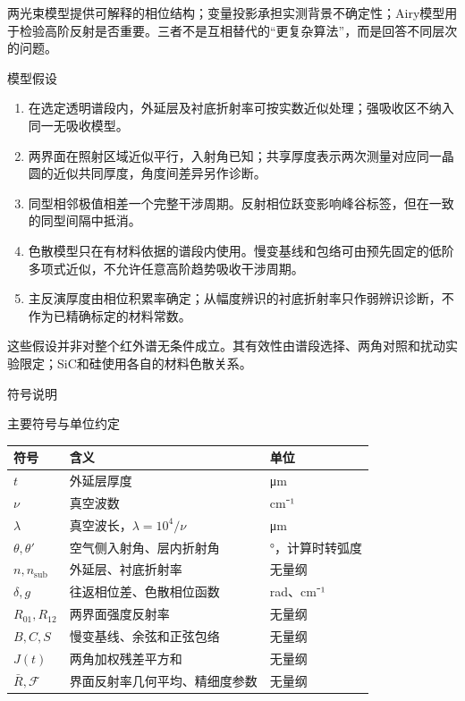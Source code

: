 两光束模型提供可解释的相位结构；变量投影承担实测背景不确定性；Airy模型用于检验高阶反射是否重要。三者不是互相替代的``更复杂算法''，而是回答不同层次的问题。

模型假设

\begin{enumerate}
\def\labelenumi{\arabic{enumi}.}
\tightlist
\item
  在选定透明谱段内，外延层及衬底折射率可按实数近似处理；强吸收区不纳入同一无吸收模型。
\item
  两界面在照射区域近似平行，入射角已知；共享厚度表示两次测量对应同一晶圆的近似共同厚度，角度间差异另作诊断。
\item
  同型相邻极值相差一个完整干涉周期。反射相位跃变影响峰谷标签，但在一致的同型间隔中抵消。
\item
  色散模型只在有材料依据的谱段内使用。慢变基线和包络可由预先固定的低阶多项式近似，不允许任意高阶趋势吸收干涉周期。
\item
  主反演厚度由相位积累率确定；从幅度辨识的衬底折射率只作弱辨识诊断，不作为已精确标定的材料常数。
\end{enumerate}

这些假设并非对整个红外谱无条件成立。其有效性由谱段选择、两角对照和扰动实验限定；SiC和硅使用各自的材料色散关系。

符号说明

主要符号与单位约定

\begin{longtable}[]{@{}lll@{}}
\toprule\noalign{}
符号 & 含义 & 单位 \\
\midrule\noalign{}
\endhead
\bottomrule\noalign{}
\endlastfoot
\(t\) & 外延层厚度 & μm \\
\(\nu\) & 真空波数 & cm⁻¹ \\
\(\lambda\) & 真空波长，\(\lambda=10^4/\nu\) & μm \\
\(\theta,\theta'\) & 空气侧入射角、层内折射角 & °，计算时转弧度 \\
\(n,n_{\mathrm{sub}}\) & 外延层、衬底折射率 & 无量纲 \\
\(\delta,g\) & 往返相位差、色散相位函数 & rad、cm⁻¹ \\
\(R_{01},R_{12}\) & 两界面强度反射率 & 无量纲 \\
\(B,C,S\) & 慢变基线、余弦和正弦包络 & 无量纲 \\
\(J(t)\) & 两角加权残差平方和 & 无量纲 \\
\(\bar R,\mathcal F\) & 界面反射率几何平均、精细度参数 & 无量纲 \\
\end{longtable}


